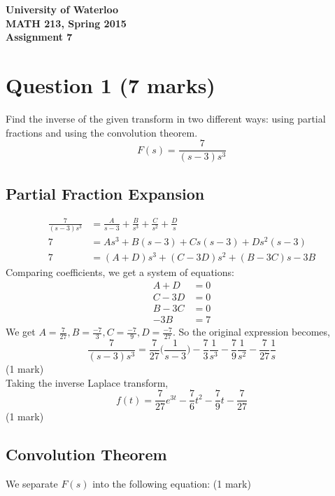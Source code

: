 \documentclass[12pt]{article}
\begin{document}
\begin{center}
{\Large\bf University of Waterloo}\\
\vspace{3mm}
{\Large\bf MATH 213, Spring 2015}\\
\vspace{2mm}
{\Large\bf Assignment 7}\\
\end{center}

\section*{Question 1 (7 marks)}
Find the inverse of the given transform in two different ways: using partial fractions and using the convolution theorem. $$F(s) = \frac{7}{(s-3)s^3}$$

\subsection*{Partial Fraction Expansion}
\begin{align*}
  \frac{7}{(s-3)s^3} &= \frac{A}{s-3} + \frac{B}{s^3} + \frac{C}{s^2} + \frac{D}{s} \\
  7 &= As^3 + B(s-3) + Cs(s-3) + Ds^2(s-3) \\
  7 &= (A+D)s^3 + (C-3D)s^2 + (B-3C)s - 3B \tag{1 mark}
\end{align*}
Comparing coefficients, we get a system of equations:
\begin{align*}
  A+D &= 0 \\
  C-3D &= 0 \\
  B-3C &= 0 \\
  -3B &= 7
\end{align*}
We get $A=\frac{7}{27},B=\frac{-7}{3},C=\frac{-7}{9},D=\frac{-7}{27}$. So the original expression becomes, $$\frac{7}{(s-3)s^3}=\frac{7}{27}\bigg(\frac{1}{s-3}\bigg) - \frac{7}{3}\frac{1}{s^3} - \frac{7}{9}\frac{1}{s^2} - \frac{7}{27}\frac{1}{s}$$ \hfill(1 mark) \\ Taking the inverse Laplace transform, $$f(t)=\frac{7}{27}e^{3t} - \frac{7}{6}t^2 - \frac{7}{9}t - \frac{7}{27}$$ \hfill (1 mark)

\subsection*{Convolution Theorem}

We separate $F(s)$ into the following equation: \hfill(1 mark)
\end{document}
